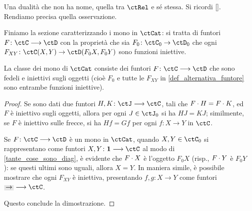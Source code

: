 \begin{example}\label{thm_dualita_stone}
\end{example}
\begin{example}\label{thm_intervalli_equiv_simplessi}
\end{example}
\begin{proposition}\label{rel_autoduale_proof}
 Una dualità che non ha nome, quella tra \(\ctRel\) e sé stessa. Si ricordi \ref{}. Rendiamo precisa quella osservazione.
\end{proposition}
Finiamo la sezione caratterizzando i mono in \(\ctCat\): si tratta di funtori \(F \colon \ctC \fun\ctD\) con la proprietà che sia \(F_0 \colon \ctC_0\to\ctD_0\) che ogni \(F_{XY} \colon \Hom{\ctC}(X,Y) \to \Hom{\ctD}(F_0X,F_0Y)\) sono funzioni iniettive.
\begin{proposition}\label{mona_in_cat}
 La classe dei mono di \(\ctCat\) consiste dei funtori \(F \colon \ctC\fun\ctD\) che sono fedeli e iniettivi sugli oggetti (cioè \(F_0\) e tutte le \(F_{XY}\) in \ref{def_alternativa_funtore} sono entrambe funzioni iniettive).
\end{proposition}
\begin{proof}
 Se sono dati due funtori \(H,K\colon\ctJ \fun \ctC\), tali che \(F\cdot H = F\cdot K\), ed \(F\) è iniettivo sugli oggetti, allora per ogni \(J\in\ctJ_0\) si ha \(HJ=KJ\); similmente, se \(F\) è iniettivo sulle frecce, si ha \(Hf = Gf\) per ogni \(f \colon X\to Y\) in \(\ctC\).

 Se \(F \colon \ctC \fun\ctD\) è un mono in \(\ctCat\), quando \(X,Y \in\ctC_0\) si rappresentano come funtori \(X,Y \colon \ctTerm \fun \ctC\) al modo di \ref{tante_cose_sono_diag}, è evidente che \(F\cdot X\) è l'oggetto \(F_0X\) (risp., \(F\cdot Y\) è \(F_0 Y\)): se questi ultimi sono uguali, allora \(X=Y\). In maniera simile, è possibile mostrare che ogni \(F_{XY}\) è iniettiva, presentando \(f,g \colon X\to Y\) come funtori \(\genArrow \fun \ctC\).

 Questo conclude la dimostrazione.
\end{proof}
